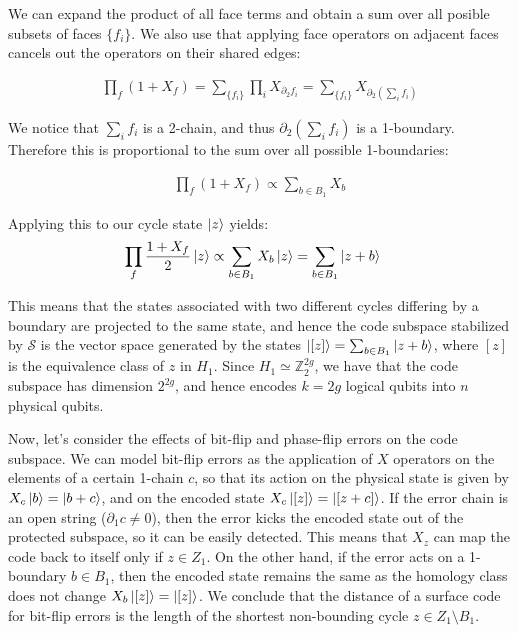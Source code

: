 \documentclass[12pt, twoside, openany]{book}
\begin{document}
We can expand the product of all face terms and obtain a sum over all posible subsets of faces $ \{f_i\} $. We also use that applying face operators on adjacent faces cancels out the operators on their shared edges:

\begin{align*}
    \prod_f (1+X_f) = \sum_{\{f_i\}} \prod_i X_{\partial_2 f_i} = \sum_{\{f_i\}} X_{\partial_2 (\sum_i f_i)}
\end{align*}

We notice that $\sum_i f_i$ is a 2-chain, and thus $\partial_2 (\sum_i f_i)$ is a 1-boundary. Therefore this is proportional to the sum over all possible 1-boundaries: 

\begin{align*}
    \prod_f (1+X_f) \propto \sum_{b \in B_1} X_b
\end{align*}

Applying this to our cycle state $\ket{z}$ yields:
\begin{align}
    \prod_f \frac{1+X_f}{2} \ket{z} &\propto \sum_{b \in B_1} X_b \ket{z} = \sum_{b \in B_1} \ket{z + b}
\end{align}

This means that the states associated with two different cycles differing by a boundary are projected to the same state, and hence the code subspace stabilized by $\mathcal{S}$ is the vector space generated by the states $\ket{[z]} = \sum_{b \in B_1} \ket{z + b}$, where $[z]$ is the equivalence class of $z$ in $H_1$. Since $H_1 \simeq \mathbb{Z}_2^{2g}$, we have that the code subspace has dimension $2^{2g}$, and hence encodes $k=2g$ logical qubits into $n$ physical qubits. 

Now, let's consider the effects of bit-flip and phase-flip errors on the code subspace. We can model bit-flip errors as the application of $X$ operators on the elements of a certain 1-chain $c$, so that its action on the physical state is given by $X_c \ket{b} = \ket{b + c}$, and on the encoded state $X_c \ket{[z]} = \ket{[z + c]}$. If the error chain is an open string ($\partial_1 c \neq 0$), then the error kicks the encoded state out of the protected subspace, so it can be easily detected. This means that $X_z$ can map the code back to itself only if $z \in Z_1$. On the other hand, if the error acts on a 1-boundary $b \in B_1$, then the encoded state remains the same as the homology class does not change $X_b \ket{[z]} = \ket{[z]}$. We conclude that the distance of a surface code for bit-flip errors is the length of the shortest non-bounding cycle $z \in Z_1 \setminus B_1$. 
\end{document}
